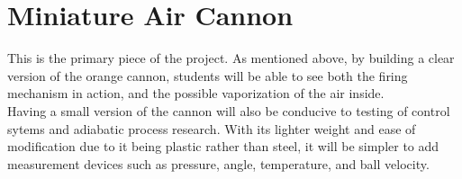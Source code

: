 \documentclass[11pt,letterpaper]{scrartcl}
\begin{document}
	\section{Miniature Air Cannon}
	This is the primary piece of the project. As mentioned above, by building a clear version of the orange cannon, students will be able to see both the firing mechanism in action, and the possible vaporization of the air inside. \\
	
	Having a small version of the cannon will also be conducive to testing of control sytems and adiabatic process research. With its lighter weight and ease of modification due to it being plastic rather than steel, it will be simpler to add measurement devices such as pressure, angle, temperature, and ball velocity.\\
	
\end{document}
